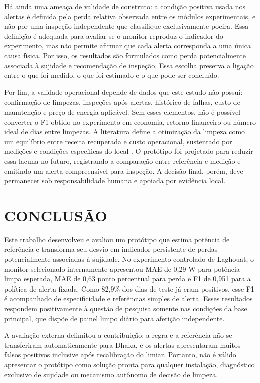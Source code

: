 \documentclass{UNESC}
\begin{document}
Há ainda uma ameaça de validade de construto: a condição positiva usada nos alertas é definida pela perda relativa observada entre os módulos experimentais, e não por uma inspeção independente que classifique exclusivamente poeira. Essa definição é adequada para avaliar se o monitor reproduz o indicador do experimento, mas não permite afirmar que cada alerta corresponda a uma única causa física. Por isso, os resultados são formulados como perda potencialmente associada à sujidade e recomendação de inspeção. Essa escolha preserva a ligação entre o que foi medido, o que foi estimado e o que pode ser concluído.

Por fim, a validade operacional depende de dados que este estudo não possui: confirmação de limpezas, inspeções após alertas, histórico de falhas, custo de manutenção e preço de energia aplicável. Sem esses elementos, não é possível converter o F1 obtido no experimento em economia, retorno financeiro ou número ideal de dias entre limpezas. A literatura define a otimização da limpeza como um equilíbrio entre receita recuperada e custo operacional, sustentado por medições e condições específicas do local \cite{muller2020profiles,ieapvps2025soiling}. O protótipo foi projetado para reduzir essa lacuna no futuro, registrando a comparação entre referência e medição e emitindo um alerta compreensível para inspeção. A decisão final, porém, deve permanecer sob responsabilidade humana e apoiada por evidência local.

\section{CONCLUSÃO}

Este trabalho desenvolveu e avaliou um protótipo que estima potência de referência e transforma seu desvio em indicador persistente de perdas potencialmente associadas à sujidade. No experimento controlado de Laghouat, o monitor selecionado internamente apresentou MAE de 0,29 W para potência limpa esperada, MAE de 0,63 ponto percentual para perda e F1 de 0,951 para a política de alerta fixada. Como 82,9\% dos dias de teste já eram positivos, esse F1 é acompanhado de especificidade e referências simples de alerta. Esses resultados respondem positivamente à questão de pesquisa somente nas condições da base principal, que dispõe de painel limpo diário para aferição independente.

A avaliação externa delimitou a contribuição: a regra e a referência não se transferiram automaticamente para Dhaka, e os alertas apresentaram muitos falsos positivos inclusive após recalibração do limiar. Portanto, não é válido apresentar o protótipo como solução pronta para qualquer instalação, diagnóstico exclusivo de sujidade ou mecanismo autônomo de decisão de limpeza.
\end{document}
